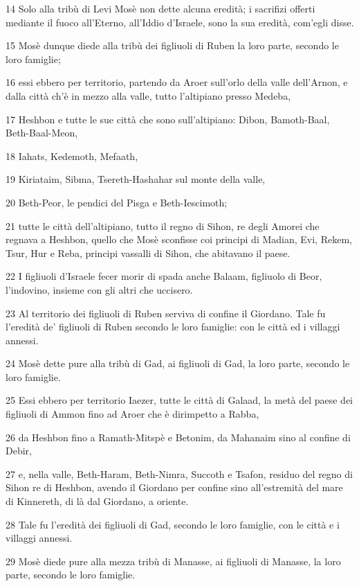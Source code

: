 \par 14 Solo alla tribù di Levi Mosè non dette alcuna eredità; i sacrifizi offerti mediante il fuoco all'Eterno, all'Iddio d'Israele, sono la sua eredità, com'egli disse.
\par 15 Mosè dunque diede alla tribù dei figliuoli di Ruben la loro parte, secondo le loro famiglie;
\par 16 essi ebbero per territorio, partendo da Aroer sull'orlo della valle dell'Arnon, e dalla città ch'è in mezzo alla valle, tutto l'altipiano presso Medeba,
\par 17 Heshbon e tutte le sue città che sono sull'altipiano: Dibon, Bamoth-Baal, Beth-Baal-Meon,
\par 18 Iahats, Kedemoth, Mefaath,
\par 19 Kiriataim, Sibma, Tsereth-Hashahar sul monte della valle,
\par 20 Beth-Peor, le pendici del Pisga e Beth-Iescimoth;
\par 21 tutte le città dell'altipiano, tutto il regno di Sihon, re degli Amorei che regnava a Heshbon, quello che Mosè sconfisse coi principi di Madian, Evi, Rekem, Tsur, Hur e Reba, principi vassalli di Sihon, che abitavano il paese.
\par 22 I figliuoli d'Israele fecer morir di spada anche Balaam, figliuolo di Beor, l'indovino, insieme con gli altri che uccisero.
\par 23 Al territorio dei figliuoli di Ruben serviva di confine il Giordano. Tale fu l'eredità de' figliuoli di Ruben secondo le loro famiglie: con le città ed i villaggi annessi.
\par 24 Mosè dette pure alla tribù di Gad, ai figliuoli di Gad, la loro parte, secondo le loro famiglie.
\par 25 Essi ebbero per territorio Iaezer, tutte le città di Galaad, la metà del paese dei figliuoli di Ammon fino ad Aroer che è dirimpetto a Rabba,
\par 26 da Heshbon fino a Ramath-Mitspè e Betonim, da Mahanaim sino al confine di Debir,
\par 27 e, nella valle, Beth-Haram, Beth-Nimra, Succoth e Tsafon, residuo del regno di Sihon re di Heshbon, avendo il Giordano per confine sino all'estremità del mare di Kinnereth, di là dal Giordano, a oriente.
\par 28 Tale fu l'eredità dei figliuoli di Gad, secondo le loro famiglie, con le città e i villaggi annessi.
\par 29 Mosè diede pure alla mezza tribù di Manasse, ai figliuoli di Manasse, la loro parte, secondo le loro famiglie.
